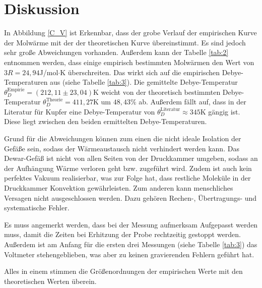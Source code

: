 \section{Diskussion}
In Abbildung \ref{C_V} ist Erkennbar,
dass der grobe Verlauf der empirischen Kurve der Molwärme
mit der der theoretischen Kurve übereinstimmt.
Es sind jedoch sehr große Abweichungen vorhanden.
Außerdem kann der Tabelle \ref{tab:2} entnommen werden,
dass einige empirisch bestimmten Molwärmen den Wert von $3R = 24,94$J/mol$\cdot$K überschreiten.
Das wirkt sich auf die empirischen Debye-Temperaturen aus (siehe Tabelle \ref{tab:3}).
Die gemittelte Debye-Temperatur $\theta_D^{\text{Empirie}} = (212,11\pm23,04)$K
weicht von der theoretisch bestimmten Debye-Temperatur $\theta_D^{\text{Theorie}} = 411,27$K
um $48,43\%$ ab.
Außerdem fällt auf, dass in der Literatur für Kupfer eine Debye-Temperatur von $\theta_D^{\text{Literatur}} \approx 345$K \cite{debye} gängig ist.
Diese liegt zwischen den beiden ermittelten Debye-Temperaturen.

Grund für die Abweichungen können zum einen die nicht ideale Isolation der Gefäße sein,
sodass der Wärmeaustausch nicht verhindert werden kann.
Das Dewar-Gefäß ist nicht von allen Seiten von der Druckkammer umgeben, sodass an der Aufhängung
Wärme verloren geht bzw. zugeführt wird.
Zudem ist auch kein perfektes Vakuum realisierbar, was zur Folge hat, dass restliche Moleküle in der Druckkammer Konvektion gewährleisten.
Zum anderen kann menschliches Versagen nicht ausgeschlossen werden.
Dazu gehören Rechen-, Übertragungs- und systematische Fehler.

Es muss angemerkt werden, dass bei der Messung aufmerksam Aufgepasst werden muss, damit die Zeiten bei Erhitzung der Probe rechtzeitig gestoppt werden.
Außerdem ist am Anfang für die ersten drei Messungen (siehe Tabelle \ref{tab:3}) das Voltmeter stehengeblieben, was aber zu keinen gravierenden Fehlern geführt hat.

Alles in einem stimmen die Größenordnungen der empirischen Werte mit den theoretischen Werten überein.
